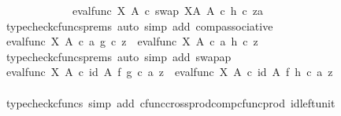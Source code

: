 \begin{isabellebody}
\ \ \ \ \ \ \ \ \ \ \ \ {\isacharequal}{\kern0pt}\ eval{\isacharunderscore}{\kern0pt}func\ X\ A\ {\isasymcirc}\isactrlsub c\ swap\ {\isacharparenleft}{\kern0pt}X\isactrlbsup A\isactrlesup {\isacharparenright}{\kern0pt}\ A\ {\isasymcirc}\isactrlsub c\ {\isasymlangle}h\ {\isasymcirc}\isactrlsub c\ z{\isacharcomma}{\kern0pt}a{\isasymrangle}{\isachardoublequoteclose}\isanewline
\ \ \ \ \ \ \ \ \ \ \ \ \isamarkupfalse%
\ {\isacharparenleft}{\kern0pt}typecheck{\isacharunderscore}{\kern0pt}cfuncs{\isacharunderscore}{\kern0pt}prems{\isacharcomma}{\kern0pt}\ auto\ simp\ add{\isacharcolon}{\kern0pt}\ comp{\isacharunderscore}{\kern0pt}associative{}{\isacharparenright}{\kern0pt}\isanewline
\ \ \ \ \ \ \ \ \ \ \isamarkupfalse%
\ \isamarkupfalse%
\ {\isachardoublequoteopen}eval{\isacharunderscore}{\kern0pt}func\ X\ A\ {\isasymcirc}\isactrlsub c\ {\isasymlangle}a{\isacharcomma}{\kern0pt}\ g\ {\isasymcirc}\isactrlsub c\ z{\isasymrangle}\ {\isacharequal}{\kern0pt}\ eval{\isacharunderscore}{\kern0pt}func\ X\ A\ {\isasymcirc}\isactrlsub c\ {\isasymlangle}a{\isacharcomma}{\kern0pt}\ h\ {\isasymcirc}\isactrlsub c\ z{\isasymrangle}{\isachardoublequoteclose}\isanewline
\ \ \ \ \ \ \ \ \ \ \ \ \isamarkupfalse%
\ {\isacharparenleft}{\kern0pt}typecheck{\isacharunderscore}{\kern0pt}cfuncs{\isacharunderscore}{\kern0pt}prems{\isacharcomma}{\kern0pt}\ auto\ simp\ add{\isacharcolon}{\kern0pt}\ swap{\isacharunderscore}{\kern0pt}ap{\isacharparenright}{\kern0pt}\isanewline
\ \ \ \ \ \ \ \ \ \ \isamarkupfalse%
\ \isamarkupfalse%
\ {\isachardoublequoteopen}eval{\isacharunderscore}{\kern0pt}func\ X\ A\ {\isasymcirc}\isactrlsub c\ {\isacharparenleft}{\kern0pt}id\ A\ {\isasymtimes}\isactrlsub f\ g{\isacharparenright}{\kern0pt}\ {\isasymcirc}\isactrlsub c\ {\isasymlangle}a{\isacharcomma}{\kern0pt}\ z{\isasymrangle}\ {\isacharequal}{\kern0pt}\ eval{\isacharunderscore}{\kern0pt}func\ X\ A\ {\isasymcirc}\isactrlsub c\ {\isacharparenleft}{\kern0pt}id\ A\ {\isasymtimes}\isactrlsub f\ h{\isacharparenright}{\kern0pt}\ {\isasymcirc}\isactrlsub c\ {\isasymlangle}a{\isacharcomma}{\kern0pt}\ z{\isasymrangle}{\isachardoublequoteclose}\isanewline
\ \ \ \ \ \ \ \ \ \ \ \ \isamarkupfalse%
\ {\isacharparenleft}{\kern0pt}typecheck{\isacharunderscore}{\kern0pt}cfuncs{\isacharcomma}{\kern0pt}\ simp\ add{\isacharcolon}{\kern0pt}\ cfunc{\isacharunderscore}{\kern0pt}cross{\isacharunderscore}{\kern0pt}prod{\isacharunderscore}{\kern0pt}comp{\isacharunderscore}{\kern0pt}cfunc{\isacharunderscore}{\kern0pt}prod\ id{\isacharunderscore}{\kern0pt}left{\isacharunderscore}{\kern0pt}unit{}{\isacharparenright}{\kern0pt}\isanewline

\end{isabellebody}
